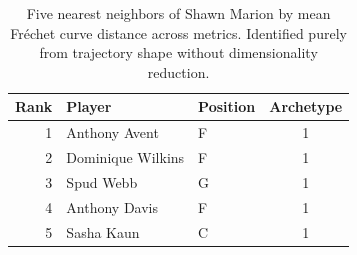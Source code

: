 \begin{table}[htbp]
  \centering\small
  \begin{tabular}{rllc}
    \toprule
    Rank & Player & Position & Archetype \\
    \midrule
    1 & Anthony Avent & F & 1 \\
    2 & Dominique Wilkins & F & 1 \\
    3 & Spud Webb & G & 1 \\
    4 & Anthony Davis & F & 1 \\
    5 & Sasha Kaun & C & 1 \\
    \bottomrule
  \end{tabular}
  \caption{Five nearest neighbors of Shawn Marion by mean Fr\'{e}chet curve distance across metrics. Identified purely from trajectory shape without dimensionality reduction.}
  \label{tab:Shawn_Marion_frechet_curve_neighbors}
\end{table}

